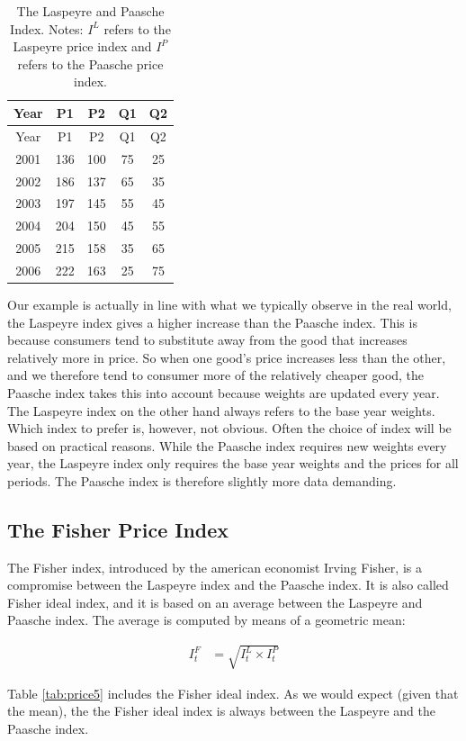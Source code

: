 \documentclass[]{book}
\begin{document}
\begin{longtable}[]{@{}ccccc@{}}
\caption{\label{tab:price4} The Laspeyre and Paasche Index. Notes: \(I^L\) refers to the Laspeyre price index and \(I^P\) refers to the Paasche price index.}\tabularnewline
\toprule
Year & P1 & P2 & Q1 & Q2\tabularnewline
\midrule
\endfirsthead
\toprule
Year & P1 & P2 & Q1 & Q2\tabularnewline
\midrule
\endhead
2001 & 136 & 100 & 75 & 25\tabularnewline
2002 & 186 & 137 & 65 & 35\tabularnewline
2003 & 197 & 145 & 55 & 45\tabularnewline
2004 & 204 & 150 & 45 & 55\tabularnewline
2005 & 215 & 158 & 35 & 65\tabularnewline
2006 & 222 & 163 & 25 & 75\tabularnewline
\bottomrule
\end{longtable}

Our example is actually in line with what we typically observe in the real world, the Laspeyre index gives a higher increase than the Paasche index. This is because consumers tend to substitute away from the good that increases relatively more in price. So when one good's price increases less than the other, and we therefore tend to consumer more of the relatively cheaper good, the Paasche index takes this into account because weights are updated every year. The Laspeyre index on the other hand always refers to the base year weights. Which index to prefer is, however, not obvious. Often the choice of index will be based on practical reasons. While the Paasche index requires new weights every year, the Laspeyre index only requires the base year weights and the prices for all periods. The Paasche index is therefore slightly more data demanding.

\hypertarget{the-fisher-price-index}{%
\subsection{The Fisher Price Index}\label{the-fisher-price-index}}

The Fisher index, introduced by the american economist Irving Fisher, is a compromise between the Laspeyre index and the Paasche index. It is also called Fisher ideal index, and it is based on an average between the Laspeyre and Paasche index. The average is computed by means of a geometric mean:

\begin{align}
      I_t^F&=\sqrt{I^ L_t\times I^ P_t} 
    \label{eq11}
\end{align}

Table \ref{tab:price5} includes the Fisher ideal index. As we would expect (given that the mean), the the Fisher ideal index is always between the Laspeyre and the Paasche index.
\end{document}
